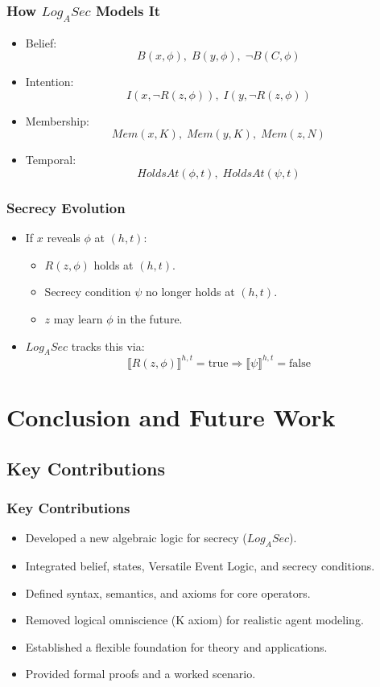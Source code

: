 \documentclass[aspectratio=169]{beamer}
\begin{document}
\begin{frame}
\frametitle{How $Log_ASec$ Models It}
\begin{itemize}
    \Large 
    \item Belief:
    \[
    B(x, \phi), \; B(y, \phi), \; \neg B(C, \phi)
    \]
    \item Intention:
    \[
    I(x, \neg R(z, \phi)), \; I(y, \neg R(z, \phi))
    \]
    \item Membership:
    \[
    Mem(x, K), \; Mem(y, K), \; Mem(z, N)
    \]
    \item Temporal:
    \[
    HoldsAt(\phi, t), \; HoldsAt(\psi, t)
    \]
\end{itemize}
\end{frame}

\begin{frame}
\frametitle{Secrecy Evolution}
\begin{itemize}
    \Large
    \item If $x$ reveals $\phi$ at $(h,t)$:
    \begin{itemize}
        \Large
        \item $R(z, \phi)$ holds at $(h,t)$.
        \item Secrecy condition $\psi$ no longer holds at $(h,t)$.
        \item $z$ may learn $\phi$ in the future.
    \end{itemize}
    \item $Log_ASec$ tracks this via:
    \[
    \llbracket R(z, \phi) \rrbracket^{h,t} = \text{true}
    \Longrightarrow 
    \llbracket \psi \rrbracket^{h,t} = \text{false}
    \]
\end{itemize}
\end{frame}


\section{Conclusion and Future Work}

\subsection{Key Contributions}
\begin{frame}
\frametitle{Key Contributions}
\begin{itemize}
    \Large
    \item Developed a new algebraic logic for secrecy ($Log_ASec$).
    \item Integrated belief, states, Versatile Event Logic, and secrecy conditions.
    \item Defined syntax, semantics, and axioms for core operators.
    \item Removed logical omniscience (K axiom) for realistic agent modeling.
    \item Established a flexible foundation for theory and applications.
    \item Provided formal proofs and a worked scenario.
\end{itemize}
\end{frame}
\end{document}
